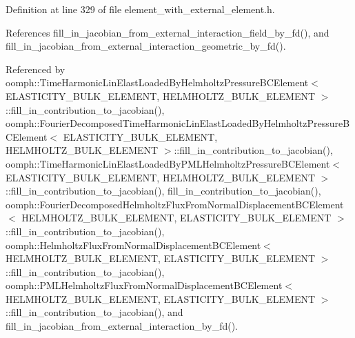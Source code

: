 Definition at line 329 of file element\+\_\+with\+\_\+external\+\_\+element.\+h.



References fill\+\_\+in\+\_\+jacobian\+\_\+from\+\_\+external\+\_\+interaction\+\_\+field\+\_\+by\+\_\+fd(), and fill\+\_\+in\+\_\+jacobian\+\_\+from\+\_\+external\+\_\+interaction\+\_\+geometric\+\_\+by\+\_\+fd().



Referenced by oomph\+::\+Time\+Harmonic\+Lin\+Elast\+Loaded\+By\+Helmholtz\+Pressure\+B\+C\+Element$<$ E\+L\+A\+S\+T\+I\+C\+I\+T\+Y\+\_\+\+B\+U\+L\+K\+\_\+\+E\+L\+E\+M\+E\+N\+T, H\+E\+L\+M\+H\+O\+L\+T\+Z\+\_\+\+B\+U\+L\+K\+\_\+\+E\+L\+E\+M\+E\+N\+T $>$\+::fill\+\_\+in\+\_\+contribution\+\_\+to\+\_\+jacobian(), oomph\+::\+Fourier\+Decomposed\+Time\+Harmonic\+Lin\+Elast\+Loaded\+By\+Helmholtz\+Pressure\+B\+C\+Element$<$ E\+L\+A\+S\+T\+I\+C\+I\+T\+Y\+\_\+\+B\+U\+L\+K\+\_\+\+E\+L\+E\+M\+E\+N\+T, H\+E\+L\+M\+H\+O\+L\+T\+Z\+\_\+\+B\+U\+L\+K\+\_\+\+E\+L\+E\+M\+E\+N\+T $>$\+::fill\+\_\+in\+\_\+contribution\+\_\+to\+\_\+jacobian(), oomph\+::\+Time\+Harmonic\+Lin\+Elast\+Loaded\+By\+P\+M\+L\+Helmholtz\+Pressure\+B\+C\+Element$<$ E\+L\+A\+S\+T\+I\+C\+I\+T\+Y\+\_\+\+B\+U\+L\+K\+\_\+\+E\+L\+E\+M\+E\+N\+T, H\+E\+L\+M\+H\+O\+L\+T\+Z\+\_\+\+B\+U\+L\+K\+\_\+\+E\+L\+E\+M\+E\+N\+T $>$\+::fill\+\_\+in\+\_\+contribution\+\_\+to\+\_\+jacobian(), fill\+\_\+in\+\_\+contribution\+\_\+to\+\_\+jacobian(), oomph\+::\+Fourier\+Decomposed\+Helmholtz\+Flux\+From\+Normal\+Displacement\+B\+C\+Element$<$ H\+E\+L\+M\+H\+O\+L\+T\+Z\+\_\+\+B\+U\+L\+K\+\_\+\+E\+L\+E\+M\+E\+N\+T, E\+L\+A\+S\+T\+I\+C\+I\+T\+Y\+\_\+\+B\+U\+L\+K\+\_\+\+E\+L\+E\+M\+E\+N\+T $>$\+::fill\+\_\+in\+\_\+contribution\+\_\+to\+\_\+jacobian(), oomph\+::\+Helmholtz\+Flux\+From\+Normal\+Displacement\+B\+C\+Element$<$ H\+E\+L\+M\+H\+O\+L\+T\+Z\+\_\+\+B\+U\+L\+K\+\_\+\+E\+L\+E\+M\+E\+N\+T, E\+L\+A\+S\+T\+I\+C\+I\+T\+Y\+\_\+\+B\+U\+L\+K\+\_\+\+E\+L\+E\+M\+E\+N\+T $>$\+::fill\+\_\+in\+\_\+contribution\+\_\+to\+\_\+jacobian(), oomph\+::\+P\+M\+L\+Helmholtz\+Flux\+From\+Normal\+Displacement\+B\+C\+Element$<$ H\+E\+L\+M\+H\+O\+L\+T\+Z\+\_\+\+B\+U\+L\+K\+\_\+\+E\+L\+E\+M\+E\+N\+T, E\+L\+A\+S\+T\+I\+C\+I\+T\+Y\+\_\+\+B\+U\+L\+K\+\_\+\+E\+L\+E\+M\+E\+N\+T $>$\+::fill\+\_\+in\+\_\+contribution\+\_\+to\+\_\+jacobian(), and fill\+\_\+in\+\_\+jacobian\+\_\+from\+\_\+external\+\_\+interaction\+\_\+by\+\_\+fd().

\mbox{\label{classoomph_1_1ElementWithExternalElement_a8a1610a620f55a8051c0426f937f11b5}} 
